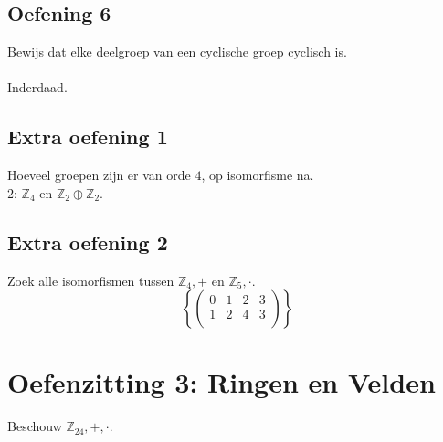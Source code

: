\documentclass[main.tex]{subfiles}
\begin{document}
\subsection*{Oefening 6}
Bewijs dat elke deelgroep van een cyclische groep cyclisch is.\\\\
Inderdaad.

\subsection*{Extra oefening 1}
Hoeveel groepen zijn er van orde $4$, op isomorfisme na.\\
$2$: $\mathbb{Z}_{4}$ en $\mathbb{Z}_{2} \oplus \mathbb{Z}_{2}$.

\subsection*{Extra oefening 2}
Zoek alle isomorfismen tussen $\mathbb{Z}_{4},+$ en $\mathbb{Z}_{5},\cdot$.
\[
\left\{
  \begin{pmatrix}
    0 & 1 & 2 & 3\\
    1 & 2 & 4 & 3\\
  \end{pmatrix}
\right\}
\]

\section{Oefenzitting 3: Ringen en Velden}
Beschouw $\mathbb{Z}_{24},+,\cdot$.
\end{document}

